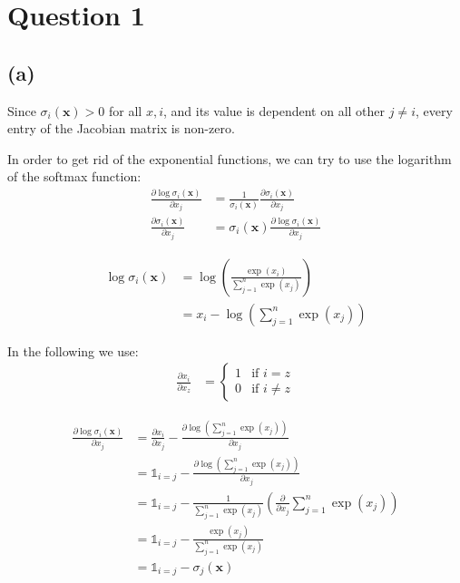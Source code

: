 \section*{Question 1}
\subsection*{(a)}
Since $\sigma_i(\boldsymbol{x}) > 0$ for all $x, i$, and its value is dependent on all other $j \neq i$, every entry of the Jacobian matrix is non-zero.

In order to get rid of the exponential functions, we can try to use the logarithm of the softmax function:
\begin{align*}
\frac{\partial \log\sigma_i(\boldsymbol{x})}{\partial x_j} &= \frac{1}{\sigma_i(\boldsymbol{x})}\frac{\partial \sigma_i(\boldsymbol{x})}{\partial x_j} \\
\frac{\partial \sigma_i(\boldsymbol{x})}{\partial x_j} &= \sigma_i(\boldsymbol{x}) \frac{\partial \log\sigma_i(\boldsymbol{x})}{\partial x_j}
\end{align*}

\begin{align*}
\log\sigma_i(\boldsymbol{x}) &= \log\left(\frac{\exp(x_i)}{\sum_{j=1}^n\exp(x_j)}\right) \\
&= x_i - \log\left(\sum_{j=1}^n\exp(x_j)\right)
\end{align*}

In the following we use:
\begin{align*}
\frac{\partial x_i}{\partial x_z} &=
\begin{cases}
1 & \text{if } i = z \\
0 & \text{if } i \neq z
\end{cases}
\end{align*}

\begin{align*}
\frac{\partial \log\sigma_i(\boldsymbol{x})}{\partial x_j} &= \frac{\partial x_i}{\partial x_j} - \frac{\partial \log\left(\sum_{j=1}^n\exp(x_j)\right)}{\partial x_j} \\
&= \mathds{1}_{i=j} - \frac{\partial \log\left(\sum_{j=1}^n\exp(x_j)\right)}{\partial x_j} \\
&= \mathds{1}_{i=j} - \frac{1}{\sum_{j=1}^n\exp(x_j)} (\frac{\partial}{\partial x_j} \sum_{j=1}^n\exp(x_j)) \\
&= \mathds{1}_{i=j} - \frac{\exp(x_j)}{\sum_{j=1}^n\exp(x_j)} \\
&= \mathds{1}_{i=j} - \sigma_j(\boldsymbol{x})
\end{align*}

